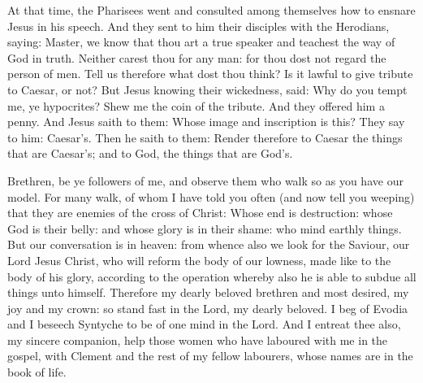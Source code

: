 
At that time, the Pharisees went and consulted among themselves how to
ensnare Jesus in his speech.
And they sent to him their disciples with the Herodians, saying:
Master, we know that thou art a true speaker and teachest the way of God
in truth. Neither carest thou for any man: for thou dost not regard the
person of men.
Tell us therefore what dost thou think? Is it lawful to give
tribute to Caesar, or not?
But Jesus knowing their wickedness, said: Why do you tempt me, ye
hypocrites?
Shew me the coin of the tribute. And they offered him a penny.
And Jesus saith to them: Whose image and inscription is this?
They say to him: Caesar's. Then he saith to them: Render
therefore to Caesar the things that are Caesar's; and to God, the things
that are God's.

\bigskip




Brethren, be ye followers of me, and observe them who walk so as
you have our model.
For many walk, of whom I have told you often (and now tell you
weeping) that they are enemies of the cross of Christ:
Whose end is destruction: whose God is their belly: and whose
glory is in their shame: who mind earthly things.
But our conversation is in heaven: from whence also we look for
the Saviour, our Lord Jesus Christ,
who will reform the body of our lowness, made like to the body of
his glory, according to the operation whereby also he is able to subdue
all things unto himself.
Therefore my dearly beloved brethren and most desired, my joy and
my crown: so stand fast in the Lord, my dearly beloved.
I beg of Evodia and I beseech Syntyche to be of one mind in the
Lord.
And I entreat thee also, my sincere companion, help those women who
have laboured with me in the gospel, with Clement and the rest of my
fellow labourers, whose names are in the book of life.



